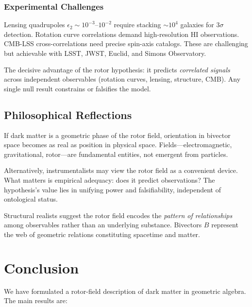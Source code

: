\documentclass[11pt,a4paper]{article}
\numberwithin{equation}{section}
\theoremstyle{plain}
\theoremstyle{definition}
\theoremstyle{remark}
\begin{document}
\subsubsection{Experimental Challenges}

Lensing quadrupoles $\epsilon_2\sim 10^{-3}$--$10^{-2}$ require stacking $\sim 10^4$ galaxies for $3\sigma$ detection. Rotation curve correlations demand high-resolution HI observations. CMB-LSS cross-correlations need precise spin-axis catalogs. These are challenging but achievable with LSST, JWST, Euclid, and Simons Observatory.

The decisive advantage of the rotor hypothesis: it predicts \emph{correlated signals} across independent observables (rotation curves, lensing, structure, CMB). Any single null result constrains or falsifies the model.

\subsection{Philosophical Reflections}

If dark matter is a geometric phase of the rotor field, orientation in bivector space becomes as real as position in physical space. Fields---electromagnetic, gravitational, rotor---are fundamental entities, not emergent from particles.

Alternatively, instrumentalists may view the rotor field as a convenient device. What matters is empirical adequacy: does it predict observations? The hypothesis's value lies in unifying power and falsifiability, independent of ontological status.

Structural realists suggest the rotor field encodes the \emph{pattern of relationships} among observables rather than an underlying substance. Bivectors $B$ represent the web of geometric relations constituting spacetime and matter.

\vspace{1em}

\section{Conclusion}\label{sec:conclusion}

We have formulated a rotor-field description of dark matter in geometric algebra. The main results are:
\end{document}

